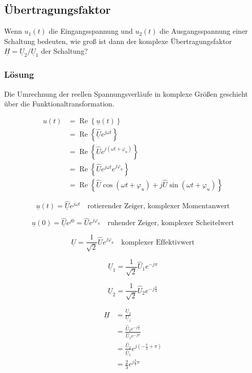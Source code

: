 \documentclass[
  ngerman,
  letterpaper,
]{scrbook}
\begin{document}
\subsection{Übertragungsfaktor}\label{uxfcbertragungsfaktor-1}

Wenn \(u_1(t)\) die Eingangsspannung und \(u_2(t)\) die Ausgangsspannung
einer Schaltung bedeuten, wie groß ist dann der komplexe
Übertragungsfaktor \(\underline{H} = \underline{U}_2 / \underline{U}_1\)
der Schaltung?

\subsubsection{Lösung}\label{luxf6sung-10}

Die Umrechnung der reellen Spannungsverläufe in komplexe Größen
geschieht über die Funktionaltransformation.

\begin{align}
u(t) &= \operatorname{Re}\left\{\underline{u}(t)\right\} \\
&= \operatorname{Re}\left\{\underline{\hat{U}}e^{j\omega t}\right\} \\
&= \operatorname{Re}\left\{\hat{U}e^{j(\omega t+\varphi_u)}\right\} \\
&= \operatorname{Re}\left\{\hat{U}e^{j\omega t}e^{j\varphi_u}\right\} \\
&= \operatorname{Re}\left\{\hat{U}\cos(\omega t + \varphi_u) + j \hat{U} \sin(\omega t + \varphi_u) \right\} 
\end{align}

\[
\underline{u}(t) = \underline{\hat{U}}e^{j\omega t} \quad \mbox{rotierender Zeiger, komplexer Momentanwert} 
\]

\[
\underline{u}(0) = \underline{\hat{U}}e^{j0}=\hat{U}e^{j\varphi_u} \quad \mbox{ruhender Zeiger, komplexer Scheitelwert} 
\]

\[ 
\underline{U} = \frac{1}{\sqrt{2}}\hat{U} e^{j\varphi_u} \quad \mbox{komplexer Effektivwert}
\]

\[
\underline{U}_1 = \frac{1}{\sqrt{2}} \hat{U}_1 e^{- j \pi} 
\]

\[
\underline{U}_2 =  \frac{1}{\sqrt{2}} \hat{U}_2 e^{-j\frac{\pi}{4}} 
\]

\begin{align}
\underline{H} &= \frac{\underline{U}_2}{\underline{U}_1} \\
&= \frac{\hat{U}_2 e^{-j\frac{\pi}{4}}}{\hat{U}_1 e^{- j \pi}} \\
&= \frac{\hat{U}_2}{\hat{U}_1} e^{j (-\frac{\pi}{4}+\pi)} \\
&= \frac{2}{3}  e^{j \frac{3}{4}\pi}
\end{align}
\end{document}
